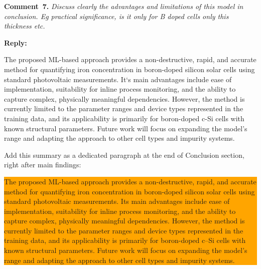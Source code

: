 \documentclass[a4paper,fleqn]{cas-sc}
\begin{document}
\vspace{1cm}
\noindent
\textcolor[rgb]{0.00,0.50,1.00}{\textbf{Comment~7.}}
\emph{Discuss clearly the advantages and limitations of this model in conclusion. Eg practical significance, is it only for B doped cells only this thickness etc.}

\noindent
\textcolor[rgb]{0.51,0.00,0.00}{\textbf{Reply:}}

The proposed ML-based approach provides a non-destructive, rapid, and accurate method for quantifying iron concentration in boron-doped silicon solar cells using standard photovoltaic measurements. 
It`s main advantages include ease of implementation, suitability for inline process monitoring, and the ability to capture complex, physically meaningful dependencies. 
However, the method is currently limited to the parameter ranges and device types represented in the training data, and its applicability is primarily for boron-doped c-Si cells with known structural parameters. 
Future work will focus on expanding the model’s range and adapting the approach to other cell types and impurity systems.

Add this summary as a dedicated paragraph at the end of Conclusion section, right after main findings:

\colorbox{orange}{\parbox{\linewidth}{The proposed ML-based approach provides a non-destructive, rapid, and accurate method for quantifying iron concentration in boron-doped silicon solar cells using standard photovoltaic measurements. 
Its main advantages include ease of implementation, suitability for inline process monitoring, and the ability to capture complex, physically meaningful dependencies. 
However, the method is currently limited to the parameter ranges and device types represented in the training data, and its applicability is primarily for boron-doped c–Si cells with known structural parameters. Future work will focus on expanding the model’s range and adapting the approach to other cell types and impurity systems.}}





\end{document}
